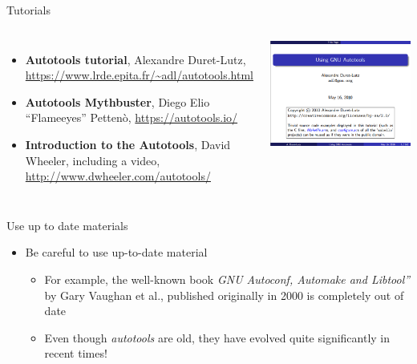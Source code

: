 \begin{frame}{Tutorials}
  \begin{columns}
    \begin{itemize}
    \item {\bf Autotools tutorial}, Alexandre Duret-Lutz,
      \url{https://www.lrde.epita.fr/~adl/autotools.html}
    \item {\bf Autotools Mythbuster}, Diego Elio “Flameeyes” Pettenò,
      \url{https://autotools.io/}
    \item {\bf Introduction to the Autotools}, David Wheeler, including
      a video, \url{http://www.dwheeler.com/autotools/}
    \end{itemize}
    \includegraphics[width=\textwidth]{slides/autotools-references/autotools-tutorial.png}
  \end{columns}
\end{frame}

\begin{frame}{Use up to date materials}
  \begin{itemize}
  \item Be careful to use up-to-date material
    \begin{itemize}
    \item For example, the well-known book {\em GNU Autoconf, Automake
        and Libtool”} by Gary Vaughan et al., published originally in
      2000 is completely out of date
    \item Even though {\em autotools} are old, they have evolved quite
      significantly in recent times!
    \end{itemize}
  \end{itemize}
\end{frame}
